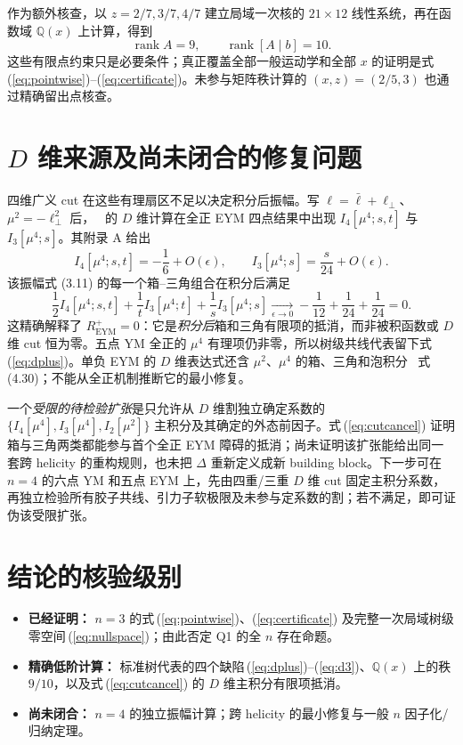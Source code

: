 \documentclass[UTF8,11pt,a4paper]{ctexart}
\newcommand{\EYM}{\mathrm{EYM}}
\begin{document}
作为额外核查，以 $z=2/7,3/7,4/7$ 建立局域一次核的 $21\times12$ 线性系统，再在函数域 $\mathbb Q(x)$ 上计算，得到
\[
 \operatorname{rank}A=9,\qquad \operatorname{rank}[A\mid b]=10.
\]
这些有限点约束只是必要条件；真正覆盖全部一般运动学和全部 $x$ 的证明是式\,(\ref{eq:pointwise})--(\ref{eq:certificate})。未参与矩阵秩计算的 $(x,z)=(2/5,3)$ 也通过精确留出点核查。

\clearpage
\section{\texorpdfstring{$D$}{D} 维来源及尚未闭合的修复问题}

四维广义 cut 在这些有理扇区不足以决定积分后振幅。写 $\ell=\bar\ell+\ell_\perp$、$\mu^2=-\ell_\perp^2$ 后，~\cite{ref:npt} 的 $D$ 维计算在全正 EYM 四点结果中出现 $I_4[\mu^4;s,t]$ 与 $I_3[\mu^4;s]$。其附录 A 给出
\[
 I_4[\mu^4;s,t]=-\frac16+O(\epsilon),\qquad
 I_3[\mu^4;s]=\frac{s}{24}+O(\epsilon).
\]
该振幅式 (3.11) 的每一个箱--三角组合在积分后满足
\begin{equation}
 \frac12 I_4[\mu^4;s,t]
 +\frac1t I_3[\mu^4;t]
 +\frac1s I_3[\mu^4;s]
 \xrightarrow[\epsilon\to0]{}-\frac1{12}+\frac1{24}+\frac1{24}=0.
\label{eq:cutcancel}
\end{equation}
这精确解释了 $R^+_{\EYM}=0$：它是\emph{积分后}箱和三角有限项的抵消，而非被积函数或 $D$ 维 cut 恒为零。五点 YM 全正的 $\mu^4$ 有理项仍非零，所以树级共线代表留下式\,(\ref{eq:dplus})。单负 EYM 的 $D$ 维表达式还含 $\mu^2$、$\mu^4$ 的箱、三角和泡积分~\cite{ref:npt} 式 (4.30)；不能从全正机制推断它的最小修复。

一个\emph{受限的待检验扩张}是只允许从 $D$ 维割独立确定系数的 $\{I_4[\mu^4],I_3[\mu^4],I_2[\mu^2]\}$ 主积分及其确定的外态前因子。式\,(\ref{eq:cutcancel}) 证明箱与三角两类都能参与首个全正 EYM 障碍的抵消；尚未证明该扩张能给出同一套跨 helicity 的重构规则，也未把 $\Delta$ 重新定义成新 building block。下一步可在 $n=4$ 的六点 YM 和五点 EYM 上，先由四重/三重 $D$ 维 cut 固定主积分系数，再独立检验所有胶子共线、引力子软极限及未参与定系数的割；若不满足，即可证伪该受限扩张。

\section*{结论的核验级别}
\begin{itemize}[leftmargin=2em,itemsep=2pt]
\item \textbf{已经证明：} $n=3$ 的式\,(\ref{eq:pointwise})、(\ref{eq:certificate}) 及完整一次局域树级零空间\,(\ref{eq:nullspace})；由此否定 Q1 的全 $n$ 存在命题。
\item \textbf{精确低阶计算：} 标准树代表的四个缺陷\,(\ref{eq:dplus})--(\ref{eq:d3})、$\mathbb Q(x)$ 上的秩 $9/10$，以及式\,(\ref{eq:cutcancel}) 的 $D$ 维主积分有限项抵消。
\item \textbf{尚未闭合：} $n=4$ 的独立振幅计算；跨 helicity 的最小修复与一般 $n$ 因子化/归纳定理。
\end{itemize}
\end{document}
